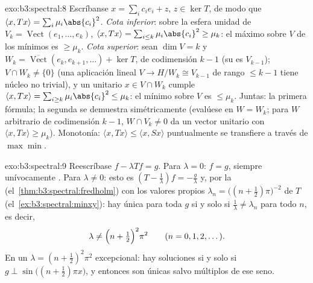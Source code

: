 \begin{solution}{exo:b3:spectral:8}
Escríbanse $x = \sum_ic_ie_i + z$, $z \in \ker T$, de modo que
$\langle x,
Tx\rangle = \sum_i\mu_i\abs{c_i}^2$. \emph{Cota inferior}: sobre la
esfera unidad de $V_k = \operatorname{Vect}(e_1, \dots,
e_k)$, $\langle x, Tx\rangle = \sum_{i\leq
k}\mu_i\abs{c_i}^2 \geq \mu_k$: el máximo sobre $V$ de los mínimos es
$\geq \mu_k$. \emph{Cota superior}: sean $\dim V = k$ y $W_k
= \overline{\operatorname{Vect}}(e_k, e_{k+1}, \dots) +
\ker T$, de codimensión $k - 1$ (su
 es
$V_{k-1}$); $V \cap W_k \neq \{0\}$ (una aplicación lineal $V \to
H/W_k \cong V_{k-1}$ de rango $\leq k - 1$ tiene núcleo no trivial), y
un unitario $x \in V\cap W_k$ cumple $\langle x,
Tx\rangle = \sum_{i \geq k}\mu_i\abs{c_i}^2 \leq \mu_k$: el mínimo sobre
$V$ es $\leq \mu_k$. Juntas: la primera fórmula; la segunda se demuestra
simétricamente (evalúese en $W = W_k$; para $W$ arbitrario de
codimensión $k-1$, $W \cap V_k \neq 0$ da un vector unitario con
$\langle x, Tx\rangle \geq \mu_k$). Monotonía:
$\langle x, Tx\rangle \leq \langle x,
Sx\rangle$ puntualmente se transfiere a través de $\max\min$.
\end{solution}

\begin{solution}{exo:b3:spectral:9}
Reescríbase $f - \lambda Tf = g$. Para $\lambda = 0$: $f = g$, siempre
unívocamente . Para
$\lambda \neq 0$: esto es $(T - \frac1\lambda)f = -\frac g\lambda$ y,
por la 
(el~\cref{thm:b3:spectral:fredholm}) con los valores propios
$\lambda_n = \bigl((n + \frac12)\pi\bigr)^{-2}$ de $T$
(el~\cref{ex:b3:spectral:minxy}): hay
 única para toda $g$ si y
solo si $\frac1\lambda \neq \lambda_n$ para todo $n$, es decir,
\[
\lambda \neq \Bigl(n + \tfrac12\Bigr)^2\pi^2
\qquad (n = 0, 1, 2, \dots).
\]
En un $\lambda = (n+\frac12)^2\pi^2$ excepcional: hay soluciones si y
solo si $g \perp \sin\bigl((n{+}\frac12)\pi x\bigr)$, y entonces son
únicas salvo múltiplos de ese seno.
\end{solution}

